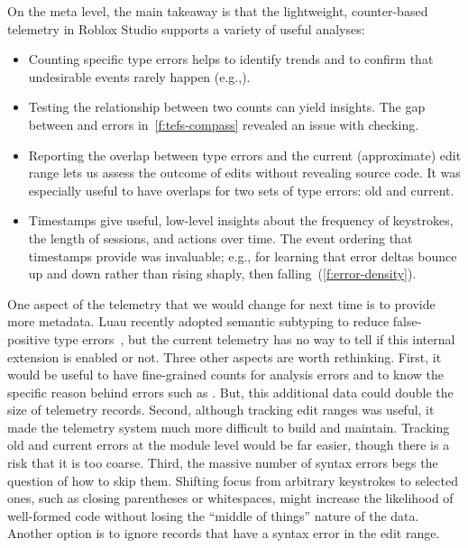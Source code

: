 \documentclass[english,submission,cleveref]{programming}
\begin{document}
On the meta level, the main takeaway is that the lightweight, counter-based telemetry
in Roblox Studio supports a variety of useful analyses:
\begin{itemize}
  \item
    Counting specific type errors helps to identify trends and to confirm that
    undesirable events rarely happen (e.g.,).
  \item
    Testing the relationship between two counts can yield insights.
    The gap between \mstrict{} and \FS{} errors in~\cref{f:tefs-compass}
    revealed an issue with \mstrict{} checking.
  \item
    Reporting the overlap between type errors and the current (approximate) edit
    range lets us assess the outcome of edits without revealing source code.
    It was especially useful to have overlaps for two sets of type errors: old and current.
  \item
    Timestamps give useful, low-level insights about the frequency of keystrokes,
    the length of sessions, and actions over time.
    The event ordering that timestamps provide was invaluable; e.g., for learning
    that error deltas bounce up and down rather than rising shaply, then falling~(\cref{f:error-density}).
\end{itemize}

One aspect of the telemetry that we would change for next time is to provide
more metadata.
Luau recently adopted semantic subtyping to reduce false-positive type
errors~\cite{CF05:GentleIntroduction,Jef22:SemanticSubtyping}, but the current
telemetry has no way to tell if this
internal extension is enabled or not.
Three other aspects are worth rethinking.
First, it would be useful to have fine-grained counts for \FS{} analysis
errors and to know the specific reason behind errors such as .
But, this additional data could double the size of telemetry records.
Second, although tracking edit ranges was useful, it made the telemetry system
much more difficult to build and maintain.
Tracking old and current errors at the module level would be far easier,
though there is a risk that it is too coarse.
Third, the massive number of syntax errors begs the question of how to skip
them.
Shifting focus from arbitrary keystrokes to selected ones, such as closing
parentheses or whitespaces, might increase the likelihood of well-formed
code without losing the ``middle of things'' nature of the data.
Another option is to ignore records that have a syntax error in the edit range.
\end{document}
